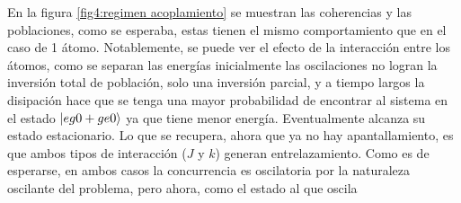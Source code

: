 En  la figura \ref{fig4:regimen acoplamiento} se  muestran las coherencias y las poblaciones, como se esperaba, estas tienen el mismo comportamiento que en el caso de 1 átomo. Notablemente, se puede ver el efecto de la interacción entre los átomos, como se separan las energías inicialmente las oscilaciones no logran la inversión total de población, solo una inversión parcial, y a tiempo largos la disipación hace que se tenga una mayor probabilidad de encontrar al sistema en el estado $\ket{eg0+ge0}$ ya que tiene menor energía. Eventualmente alcanza su estado estacionario. Lo que se recupera, ahora que ya no hay apantallamiento, es que ambos tipos de interacción ($J$ y $k$) generan entrelazamiento. Como es de esperarse, en ambos casos la concurrencia es oscilatoria por la naturaleza oscilante del problema, pero ahora, como el estado al que oscila

